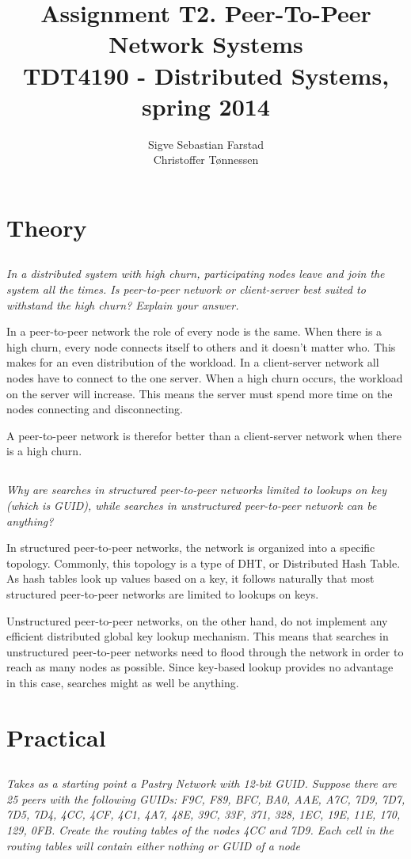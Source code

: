 \documentclass{article}
\title{Assignment T2. Peer-To-Peer Network Systems \\
\large TDT4190 - Distributed Systems, spring 2014}
\author{
    Sigve Sebastian Farstad \\
    Christoffer Tønnessen
}
\newcommand{\question}[1]{\subsection{}\textit{#1}\bigskip}
\begin{document}
\maketitle

\section{Theory}

\question{In a distributed system with high churn, participating nodes leave and join the system all the times. Is peer-to-peer network or client-server best suited to withstand the high churn? Explain your answer.}

In a peer-to-peer network the role of every node is the same.
When there is a high churn, every node connects itself to others and it doesn't matter who.
This makes for an even distribution of the workload.
In a client-server network all nodes have to connect to the one server.
When a high churn occurs, the workload on the server will increase.
This means the server must spend more time on the nodes connecting and disconnecting.

A peer-to-peer network is therefor better than a client-server network when there is a high churn.

\question{Why are searches in structured peer-to-peer networks limited to lookups on key (which is GUID), while searches in unstructured peer-to-peer network can be anything?}

In structured peer-to-peer networks, the network is organized into a specific topology.
Commonly, this topology is a type of DHT, or Distributed Hash Table.
As hash tables look up values based on a key, it follows naturally that most structured peer-to-peer networks are limited to lookups on keys.

Unstructured peer-to-peer networks, on the other hand, do not implement any efficient distributed global key lookup mechanism.
This means that searches in unstructured peer-to-peer networks need to flood through the network in order to reach as many nodes as possible.
Since key-based lookup provides no advantage in this case, searches might as well be anything.

\section{Practical}

\question{Takes as a starting point a Pastry Network with 12-bit GUID. Suppose there are 25 peers with the following GUIDs: F9C, F89, BFC, BA0, AAE, A7C, 7D9, 7D7, 7D5, 7D4, 4CC, 4CF, 4C1, 4A7, 48E, 39C, 33F, 371, 328, 1EC, 19E, 11E, 170, 129, 0FB. Create the routing tables of the nodes 4CC and 7D9. Each cell in the routing tables will contain either nothing or GUID of a node}
\end{document}
